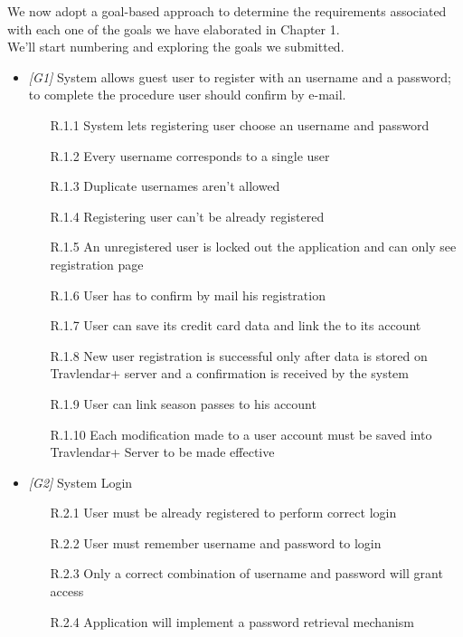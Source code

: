 We now adopt a goal-based approach to determine the requirements associated with each one of the goals we have elaborated in Chapter 1.\\
We'll start numbering and exploring the goals we submitted.

\begin{itemize}
	\item \textit{[G1]} 
		System allows guest user to register with an username and a password; to complete the procedure user should confirm by e-mail.
               
                  \begin{itemize}
                        \item [R.1.1] System lets registering user choose an username and password
                        \item [R.1.2] Every username corresponds to a single user
                        \item [R.1.3] Duplicate usernames aren’t allowed
                        \item [R.1.4] Registering user can't be already registered
                        \item [R.1.5] An unregistered user is locked out the application and can only see registration page
                        \item [R.1.6] User has to confirm by mail his registration
                        \item [R.1.7] User can save its credit card data and link the to its account
                        \item [R.1.8] New user registration is successful only after data is stored on Travlendar+ server and a confirmation is received by the system
                        \item [R.1.9] User can link season passes to his account
                        \item [R.1.10] Each modification made to a user account must be saved into Travlendar+ Server to be made effective
                  \end{itemize}
             
\item \textit{[G2]} System Login

                  \begin{itemize}
                        \item [R.2.1] User must be already registered to perform correct login
                        \item [R.2.2] User must remember username and password to login
                        \item [R.2.3] Only a correct combination of username and password will grant access
                        \item [R.2.4] Application will implement a password retrieval mechanism
                  \end{itemize}
                  

\end{itemize}
